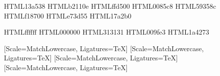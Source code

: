 
\usepackage[utf8]{inputenc}
\usepackage[T1]{fontenc}

\usepackage[ngerman]{babel}
\usepackage[iso,german]{isodate}
\usepackage{hyphenat}
\usepackage[babel=true]{csquotes}

\usepackage[toc,page]{appendix}
\renewcommand{\appendixpagename}{\section*{Anhang}}
\renewcommand{\appendixtocname}{Anhang}

\usepackage[usenames,dvipsnames,svgnames,table]{xcolor}

\definecolor{THDGreen}      {HTML}{13a538}%
\definecolor{THDDarkRed}    {HTML}{b2110e}%
\definecolor{THDYellow}     {HTML}{ffd500}%
\definecolor{THDStrongBlue} {HTML}{0085c8}%
\definecolor{THDPurple}     {HTML}{59358c}%
\definecolor{THDOrange}     {HTML}{f18700}%
\definecolor{THDBrightRed}  {HTML}{e73d55}%
\definecolor{THDCyan}       {HTML}{17a2b0}%

\definecolor{THDWhite}      {HTML}{ffffff}
\definecolor{THDBlack}      {HTML}{000000}
\definecolor{THDGrey}       {HTML}{313131}
\definecolor{THDDonauBlau}  {HTML}{009fe3}%
\definecolor{THDBlau}       {HTML}{1a4273}%

\newcommand\HighlightColor{\color{HighlightColor}}

\addtokomafont{disposition}{\HighlightColor\sffamily}
\newcommand{\subsubsubsection}[1]{\paragraph{#1}\mbox{}\\}

\usepackage{fontspec}
\usepackage{textcomp}
\newfontfamily{}[Scale=MatchLowercase, Ligatures=TeX]
\newfontfamily{}[Scale=MatchLowercase, Ligatures=TeX]
\newfontfamily{}[Scale=MatchLowercase, Ligatures=TeX]
\newfontfamily{}[Scale=MatchLowercase, Ligatures=TeX]
\setsansfont[Ligatures=TeX]{Helvetica Neue}
\setmonofont[Scale=MatchLowercase, Ligatures=TeX, Contextuals={Alternate}]{Fira Code}
\setmainfont[Ligatures=TeX]{Minion Pro}

